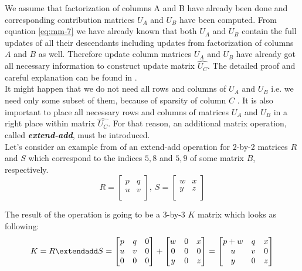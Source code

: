 We assume that factorization of columns A and B have already been done and corresponding contribution matrices $U_{A}$ and $U_{B}$ have been computed. From equation \ref{eq:mm-7} we have already known that both $U_{A}$ and $U_{B}$ contain the full updates of all their descendants including updates from factorization of columns $A$ and $B$ as well. Therefore update column matrices $U_{A}$ and $U_{B}$ have already got all necessary information to construct update matrix $\hat{U_{C}}$. The detailed proof and careful explanation can be found in \cite{mult-frontal-original:2}.\\


It might happen that we do not need all rows and columns of $U_{A}$ and $U_{B}$ i.e. we need only some subset of them, because of sparsity of column $C$ . It is also important to place all necessary rows and columns of matrices $U_{A}$ and $U_{B}$ in a right place within matrix $\hat{U_{C}}$. For that reason, an additional matrix operation, called \textbf{\textit{extend-add}}, must be introduced.\\

Let's consider an example from \cite{mult-frontal-original:2} of an extend-add operation for 2-by-2 matrices $R$ and $S$ which correspond to the indices ${5,8}$ and ${5,9}$ of some matrix $B$, respectively.\\

\begin{equation}
R = \begin{bmatrix}
p & q \\
u & v \\
\end{bmatrix} 
,
\:
S = \begin{bmatrix}
w & x \\
y & z \\
\end{bmatrix} 
\end{equation}

The result of the operation is going to be a 3-by-3 $K$ matrix which looks as following:\\

\begin{equation} \label{eq:mm-8}
K = R \extendadd S = \begin{bmatrix}
p & q & 0 \\
u & v & 0 \\
0 & 0 & 0 \\
\end{bmatrix} 
+
\begin{bmatrix}
w & 0 & x \\
0 & 0 & 0 \\
y & 0 & z \\
\end{bmatrix} 
=
\begin{bmatrix}
p + w & q & x \\
u & v & 0 \\
y & 0 & z \\
\end{bmatrix} 
\end{equation}

